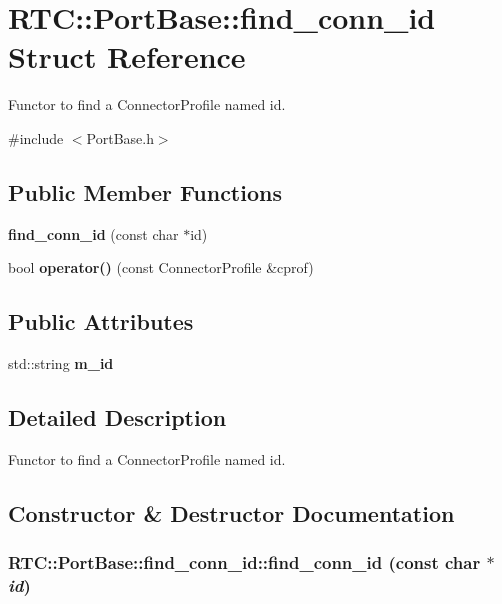 \section{RTC::PortBase::find\_\-conn\_\-id Struct Reference}
\label{structRTC_1_1PortBase_1_1find__conn__id}


Functor to find a ConnectorProfile named id.  




{\ttfamily \#include $<$PortBase.h$>$}

\subsection*{Public Member Functions}
\begin{DoxyCompactItemize}
\item 
{\bf find\_\-conn\_\-id} (const char $\ast$id)
\item 
bool {\bf operator()} (const ConnectorProfile \&cprof)
\end{DoxyCompactItemize}
\subsection*{Public Attributes}
\begin{DoxyCompactItemize}
\item 
std::string {\bf m\_\-id}
\end{DoxyCompactItemize}


\subsection{Detailed Description}
Functor to find a ConnectorProfile named id. 

\subsection{Constructor \& Destructor Documentation}
\subsubsection[{find\_\-conn\_\-id}]{\setlength{\rightskip}{0pt plus 5cm}RTC::PortBase::find\_\-conn\_\-id::find\_\-conn\_\-id (const char $\ast$ {\em id})\hspace{0.3cm}{\ttfamily  [inline]}}\label{structRTC_1_1PortBase_1_1find__conn__id_a0c5e57c7f8b1bf719135c52eed175223}


